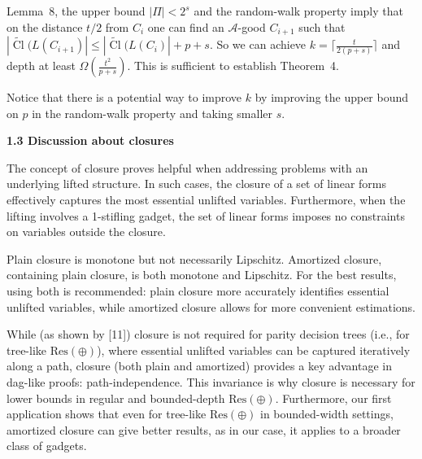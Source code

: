 \documentclass[10pt,a4paper]{article}
\begin{document}
Lemma 8, the upper bound $|\Pi|<2^{s}$ and the random-walk property imply that on the distance $t/2$ from $C_{i}$ one can find an $\mathcal{A}$-good $C_{i+1}$ such that $|\widetilde{\mathop{\mathrm{Cl}}}(L(C_{i+1})|\leq|\widetilde{\mathop{\mathrm{Cl}}}(L(C_{i})|+p+s$. So we can achieve $k=\lceil\frac{t}{2(p+s)}\rceil$ and depth at least $\Omega\left(\frac{t^{2}}{p+s}\right)$. This is sufficient to establish Theorem 4.\par



Notice that there is a potential way to improve $k$ by improving the upper bound on $p$ in the random-walk property and taking smaller $s$.\par


\par\medskip\noindent\textbf{
1.3 Discussion about closures}\par


The concept of closure proves helpful when addressing problems with an underlying lifted structure. In such cases, the closure of a set of linear forms effectively captures the most essential unlifted variables. Furthermore, when the lifting involves a 1-stifling gadget, the set of linear forms imposes no constraints on variables outside the closure.\par



Plain closure is monotone but not necessarily Lipschitz. Amortized closure, containing plain closure, is both monotone and Lipschitz. For the best results, using both is recommended: plain closure more accurately identifies essential unlifted variables, while amortized closure allows for more convenient estimations.\par



While (as shown by [11]) closure is not required for parity decision trees (i.e., for tree-like $\mathrm{Res}(\oplus)$), where essential unlifted variables can be captured iteratively along a path, closure (both plain and amortized) provides a key advantage in dag-like proofs: path-independence. This invariance is why closure is necessary for lower bounds in regular and bounded-depth $\mathrm{Res}(\oplus)$. Furthermore, our first application shows that even for tree-like $\mathrm{Res}(\oplus)$ in bounded-width settings, amortized closure can give better results, as in our case, it applies to a broader class of gadgets.\par
\end{document}
